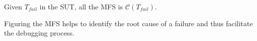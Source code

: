 \begin{proposition}\label{pro:minmalfaultyschemastests}
Given  $T_{fail}$ in the SUT, all the MFS is $\mathcal{C}(T_{fail})$.
\end{proposition}

Figuring the MFS helps to identify the root cause of a failure and thus facilitate the debugging process.


%




%

%


